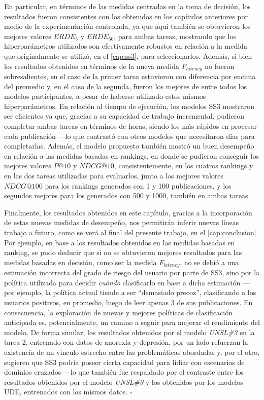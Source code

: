 En particular, en términos de las medidas centradas en la toma de decisión, los resultados fueron consistentes con los obtenidos en los capítulos anteriores por medio de la experimentación controlada, ya que aquí también se obtuvieron los mejores valores $ERDE_5$ y $ERDE_{50}$, para ambas tareas, mostrando que los hiperparámetros utilizados son efectivamente robustos en relación a la medida que originalmente se utilizó, en el \autoref{cap:ss3}, para seleccionarlos.
Además, si bien los resultados obtenidos en términos de la nueva medida $F_{latency}$ no fueron sobresalientes, en el caso de la primer tarea estuvieron con diferencia por encima del promedio y, en el caso de la segunda, fueron los mejores de entre todos los modelos participantes, a pesar de haberse utilizado estos mismos hiperparámetros. %
En relación al tiempo de ejecución, los modelos SS3 mostraron ser eficientes ya que, gracias a su capacidad de trabajo incremental, pudieron completar ambas tareas en términos de horas, siendo los más rápidos en procesar cada publicación ---lo que contrastó con otros modelos que necesitaron días para completarlas.
Además, el modelo propuesto también mostró un buen desempeño en relación a las medidas basadas en rankings, en donde se pudieron conseguir los mejores valores $P@10$ y  $NDCG@10$, consistentemente, en los cuatros rankings y en las dos tareas utilizadas para evaluarlos, junto a los mejores valores $NDCG@100$ para los rankings generados con 1 y 100 publicaciones, y los segundos mejores para los generados con 500 y 1000, también en ambas tareas.

Finalmente, los resultados obtenidos en este capítulo, gracias a la incorporación de estas nuevas medidas de desempeño, nos permitirán inferir nuevas líneas trabajo a futuro, como se verá al final del presente trabajo, en el \autoref{cap:conclusion}.
Por ejemplo, en base a los resultados obtenidos en las medidas basadas en ranking, se pudo deducir que si no se obtuvieron mejores resultados para las medidas basadas en decisión, como ser la medida $F_{latency}$, no se debió a una estimación incorrecta del grado de riesgo del usuario por parte de SS3, sino por la política utilizada para decidir \emph{cuándo} clasificarlo en base a dicha estimación ---por ejemplo, la política actual tiende a ser ``demasiado precoz'', clasificando a los usuarios positivos, en promedio, luego de leer apenas 3 de sus publicaciones.
En consecuencia, la exploración de nuevas y mejores políticas de clasificación anticipada es, potencialmente, un camino a seguir para mejorar el rendimiento del modelo.
De forma similar, los resultados obtenidos por el modelo \emph{UNSL\#3} en la tarea 2, entrenado con datos de anorexia y depresión, por un lado refuerzan la existencia de un vinculo estrecho entre las problemáticas abordadas y, por el otro, sugieren que SS3 podría poseer cierta capacidad para lidiar con escenarios de dominios cruzados ---lo que también fue respaldado por el contraste entre los resultados obtenidos por el modelo \emph{UNSL\#3} y los obtenidos por los modelos UDE, entrenados con los mismos datos. \hfill$\square$